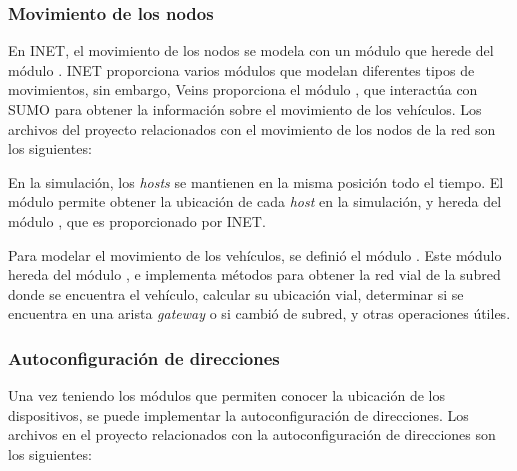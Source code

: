 \subsubsection{Movimiento de los nodos}

\label{subsubsec:movimiento_de_los_nodos}

En INET, el movimiento de los nodos se modela con un módulo que herede del
módulo . INET proporciona varios módulos que modelan
diferentes tipos de movimientos, sin embargo, Veins proporciona el módulo
, que interactúa con SUMO para obtener la información
sobre el movimiento de los vehículos. Los archivos del proyecto relacionados
con el movimiento de los nodos de la red son los siguientes:


\begin{sloppypar}
En la simulación, los \textit{hosts} se mantienen en la misma posición todo el
tiempo. El módulo  permite obtener la ubicación de
cada \textit{host} en la simulación, y hereda del módulo
, que es proporcionado por INET.
\end{sloppypar}

Para modelar el movimiento de los vehículos, se definió el módulo
. Este módulo hereda del módulo , e
implementa métodos para obtener la red vial de la subred donde se encuentra el
vehículo, calcular su ubicación vial, determinar si se encuentra en una arista
\textit{gateway} o si cambió de subred, y otras operaciones útiles.


\subsubsection{Autoconfiguración de direcciones}

\label{subsubsec:autoconfiguracion_de_direcciones_sim}

Una vez teniendo los módulos que permiten conocer la ubicación de los
dispositivos, se puede implementar la autoconfiguración de direcciones. Los
archivos en el proyecto relacionados con la autoconfiguración de direcciones
son los siguientes:
\newpage

